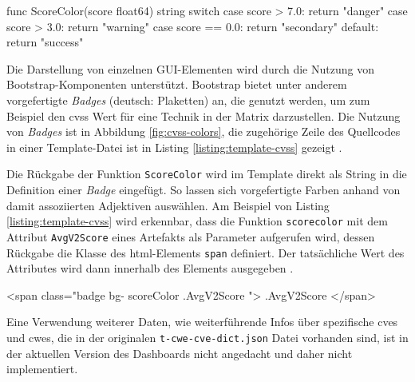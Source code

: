 \begin{code}[caption={Implementierung der farblichen Kategorisierung von Schweregraden}]
    func ScoreColor(score float64) string {
        switch {
            case score > 7.0:
            return "danger"
            case score > 3.0:
            return "warning"
            case score == 0.0:
            return "secondary"
            default:
            return "success"
        }
    }
\end{code}
\label{list:scorecolor}
Die Darstellung von einzelnen GUI-Elementen wird durch die Nutzung von Bootstrap-Komponenten unterstützt. Bootstrap bietet unter anderem vorgefertigte \textit{Badges} (deutsch: Plaketten) an, die genutzt werden, um zum Beispiel den \gls{cvss} Wert für eine Technik in der Matrix darzustellen. Die Nutzung von \textit{Badges} ist in Abbildung \ref{fig:cvss-colors}, die zugehörige Zeile des Quellcodes in einer Template-Datei ist in Listing \ref{listing:template-cvss} gezeigt \autocite{contributorsmarkottojacobthorntonandbootstrapBadges}.

Die Rückgabe der Funktion \verb|ScoreColor| wird im Template direkt als String in die Definition einer \textit{Badge} eingefügt. So lassen sich vorgefertigte Farben anhand von damit assoziierten Adjektiven auswählen. Am Beispiel von Listing \ref{listing:template-cvss} wird erkennbar, dass die Funktion \verb|scorecolor| mit dem Attribut \verb|AvgV2Score| eines Artefakts als Parameter aufgerufen wird, dessen Rückgabe die Klasse des \gls{html}-Elements \verb|span| definiert. Der tatsächliche Wert des Attributes wird dann innerhalb des Elements ausgegeben \autocite{HTMLSpanTag}.

\begin{code}[caption=Aufbau eines \gls{html} Elements zur Darstellung eines CVSS Werts in einer Bootstrap Komponente]
    <span class="badge bg-{{ scoreColor .AvgV2Score }}">{{ .AvgV2Score }}</span>
\end{code}
\label{listing:template-cvss}

Eine Verwendung weiterer Daten, wie weiterführende Infos über spezifische \glspl{cve} und \glspl{cwe}, die in der originalen \verb|t-cwe-cve-dict.json| Datei vorhanden sind, ist in der aktuellen Version des Dashboards nicht angedacht und daher nicht implementiert. 


